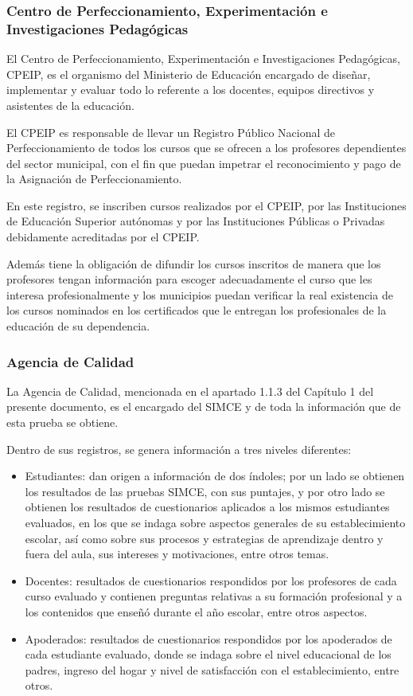 \subsubsection{Centro de Perfeccionamiento, Experimentación e Investigaciones Pedagógicas}
El Centro de Perfeccionamiento, Experimentación e Investigaciones Pedagógicas, CPEIP, es el organismo del Ministerio de Educación encargado de diseñar, implementar y evaluar todo lo referente a los docentes, equipos directivos y asistentes de la educación.

El CPEIP es responsable de llevar un Registro Público Nacional de Perfeccionamiento de todos los cursos que se ofrecen a los profesores dependientes del sector municipal, con el fin que puedan impetrar el reconocimiento y pago de la Asignación de Perfeccionamiento.
 
En este registro, se inscriben cursos realizados por el CPEIP, por las Instituciones de Educación Superior autónomas y por las Instituciones Públicas o Privadas debidamente acreditadas por el CPEIP.
 
Además tiene la obligación de difundir los cursos inscritos de manera que los profesores tengan información para escoger adecuadamente el curso que les interesa profesionalmente y los municipios puedan verificar la real existencia de los cursos nominados en los certificados que le entregan los profesionales de la educación de su dependencia.

\subsubsection{Agencia de Calidad}
La Agencia de Calidad, mencionada en el apartado 1.1.3 del Capítulo 1 del presente documento, es el encargado del SIMCE y de toda la información que de esta prueba se obtiene. 

Dentro de sus registros, se genera información a tres niveles diferentes: 
\begin{itemize}
\item Estudiantes: dan origen a información de dos índoles; por un lado se obtienen los resultados de las pruebas SIMCE, con sus puntajes, y por otro lado se obtienen los resultados de cuestionarios aplicados a los mismos estudiantes evaluados, en los que se indaga sobre aspectos generales de su establecimiento escolar, así como sobre sus procesos y estrategias de aprendizaje dentro y fuera del aula, sus intereses y motivaciones, entre otros temas.
\item Docentes: resultados de cuestionarios respondidos por los profesores de cada curso evaluado y contienen preguntas relativas a su formación profesional y a los contenidos que enseñó durante el año escolar, entre otros aspectos.
\item Apoderados: resultados de cuestionarios respondidos por los apoderados de cada estudiante evaluado, donde se indaga sobre el nivel educacional de los padres, ingreso del hogar y nivel de satisfacción con el establecimiento, entre otros.
\end{itemize}

